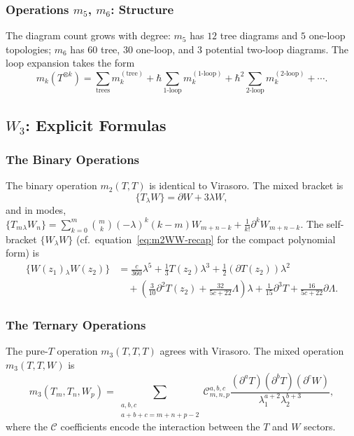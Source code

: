 \subsubsection{Operations $m_5$, $m_6$: Structure}

The diagram count grows with degree:
$m_5$ has $12$ tree diagrams and $5$ one-loop topologies;
$m_6$ has $60$ tree, $30$ one-loop, and $3$ potential two-loop diagrams.
The loop expansion takes the form
\begin{equation}
m_k(T^{\otimes k}) = \sum_{\text{trees}} m_k^{(\text{tree})} + \hbar \sum_{\text{1-loop}} m_k^{(1\text{-loop})} + \hbar^2 \sum_{\text{2-loop}} m_k^{(2\text{-loop})} + \cdots.
\end{equation}

\subsection{$W_3$: Explicit Formulas}

\subsubsection{The Binary Operations}

The binary operation $m_2(T,T)$ is identical to Virasoro.
The mixed bracket is
\[
\{T_\lambda W\} = \partial W + 3\lambda W,
\]
and in modes,
$\{T_m {}_\lambda W_n\} = \sum_{k=0}^m \binom{m}{k} (-\lambda)^k (k-m) W_{m+n-k} + \frac{1}{k!} \partial^k W_{m+n-k}$.
The self-bracket $\{W_\lambda W\}$
(cf.\ equation~\eqref{eq:m2WW-recap} for the compact
polynomial form) is
\begin{align}
\{W(z_1) {}_\lambda W(z_2)\} &= \frac{c}{360}\lambda^5 + \frac{1}{3}T(z_2)\lambda^3 + \frac{1}{2}(\partial T(z_2))\lambda^2\\
&\quad + \left(\frac{3}{10}\partial^2 T(z_2) + \frac{32}{5c+22}\Lambda\right)\lambda + \frac{1}{15}\partial^3 T + \frac{16}{5c+22}\partial\Lambda.
\end{align}

\subsubsection{The Ternary Operations}

The pure-$T$ operation $m_3(T,T,T)$ agrees with Virasoro.
The mixed operation $m_3(T,T,W)$ is
\begin{equation}
m_3(T_m, T_n, W_p) = \sum_{\substack{a,b,c \\ a+b+c = m+n+p-2}} \mathcal{C}_{m,n,p}^{a,b,c} \frac{(\partial^a T)(\partial^b T)(\partial^c W)}{\lambda_1^{a+2} \lambda_2^{b+3}},
\end{equation}
where the $\mathcal{C}$ coefficients encode the interaction between the $T$ and $W$ sectors.

